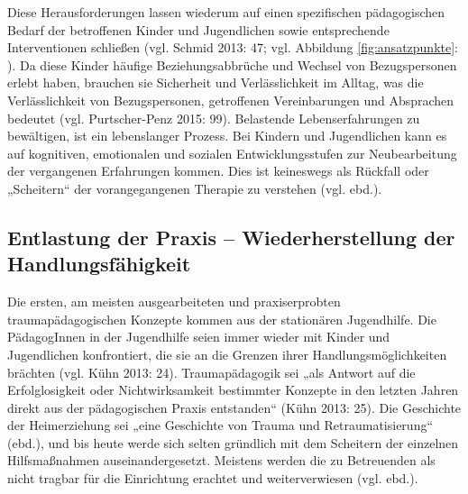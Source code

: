 Diese Herausforderungen lassen wiederum auf einen spezifischen pädagogischen Bedarf der betroffenen Kinder und Jugendlichen sowie entsprechende Interventionen schließen (vgl. Schmid 2013: 47; vgl. Abbildung \ref{fig:ansatzpunkte}: \pageref{fig:ansatzpunkte}). Da diese Kinder häufige Beziehungsabbrüche und Wechsel von Bezugspersonen erlebt haben, brauchen sie Sicherheit und Verlässlichkeit im Alltag, was die Verlässlichkeit von Bezugspersonen, getroffenen Vereinbarungen und Absprachen bedeutet (vgl. Purtscher-Penz 2015: 99). Belastende Lebenserfahrungen zu bewältigen, ist ein lebenslanger Prozess. Bei Kindern und Jugendlichen kann es auf kognitiven, emotionalen und sozialen Entwicklungsstufen zur Neubearbeitung der vergangenen Erfahrungen kommen. Dies ist keineswegs als Rückfall oder „Scheitern“ der vorangegangenen Therapie zu verstehen (vgl. ebd.).

\subsection{Entlastung der Praxis – Wiederherstellung der Handlungsfähigkeit}
Die ersten, am meisten ausgearbeiteten und praxiserprobten traumapädagogischen Konzepte kommen aus der stationären Jugendhilfe. Die PädagogInnen in der Jugendhilfe seien immer wieder mit Kinder und Jugendlichen konfrontiert, die sie an die Grenzen ihrer Handlungsmöglichkeiten brächten (vgl. Kühn 2013: 24). Traumap{\"a}dagogik sei „als Antwort auf die Erfolglosigkeit oder Nichtwirksamkeit bestimmter Konzepte in den letzten Jahren direkt aus der pädagogischen Praxis entstanden“ (Kühn 2013: 25). Die Geschichte der Heimerziehung sei „eine Geschichte von Trauma und Retraumatisierung“ (ebd.), und bis heute werde sich selten gründlich mit dem Scheitern der einzelnen Hilfsmaßnahmen auseinandergesetzt. Meistens werden die zu Betreuenden als nicht tragbar für die Einrichtung erachtet und weiterverwiesen (vgl. ebd.).

